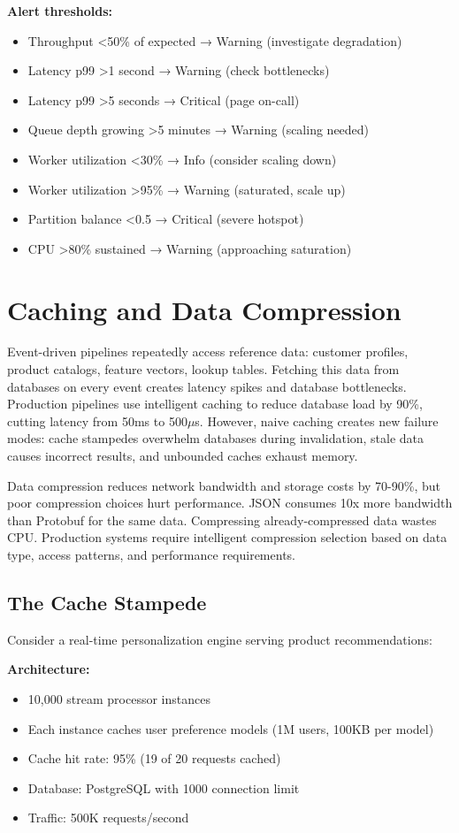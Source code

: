 \textbf{Alert thresholds:}
\begin{itemize}
    \item Throughput <50\% of expected → Warning (investigate degradation)
    \item Latency p99 >1 second → Warning (check bottlenecks)
    \item Latency p99 >5 seconds → Critical (page on-call)
    \item Queue depth growing >5 minutes → Warning (scaling needed)
    \item Worker utilization <30\% → Info (consider scaling down)
    \item Worker utilization >95\% → Warning (saturated, scale up)
    \item Partition balance <0.5 → Critical (severe hotspot)
    \item CPU >80\% sustained → Warning (approaching saturation)
\end{itemize}

\section{Caching and Data Compression}

Event-driven pipelines repeatedly access reference data: customer profiles, product catalogs, feature vectors, lookup tables. Fetching this data from databases on every event creates latency spikes and database bottlenecks. Production pipelines use intelligent caching to reduce database load by 90\%, cutting latency from 50ms to 500\ensuremath{\mu}s. However, naive caching creates new failure modes: cache stampedes overwhelm databases during invalidation, stale data causes incorrect results, and unbounded caches exhaust memory.

Data compression reduces network bandwidth and storage costs by 70-90\%, but poor compression choices hurt performance. JSON consumes 10x more bandwidth than Protobuf for the same data. Compressing already-compressed data wastes CPU. Production systems require intelligent compression selection based on data type, access patterns, and performance requirements.

\subsection{The Cache Stampede}

Consider a real-time personalization engine serving product recommendations:

\textbf{Architecture:}
\begin{itemize}
    \item 10,000 stream processor instances
    \item Each instance caches user preference models (1M users, 100KB per model)
    \item Cache hit rate: 95\% (19 of 20 requests cached)
    \item Database: PostgreSQL with 1000 connection limit
    \item Traffic: 500K requests/second
\end{itemize}

